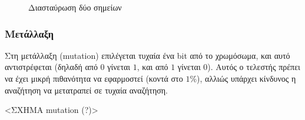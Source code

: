 \begin{figure}[!t]
    \centering
    \def\svgwidth{2.5in}
    
    \caption{Διασταύρωση δύο σημείων \cite{tpc_fig}}
    \label{fig_tpc}
\end{figure}

\subsubsection{Μετάλλαξη}

Στη μετάλλαξη (mutation) επιλέγεται τυχαία ένα bit από το χρωμόσωμα, και αυτό αντιστρέφεται (δηλαδή από $0$ γίνεται $1$, και από $1$ γίνεται $0$). Αυτός ο τελεστής πρέπει να έχει μικρή πιθανότητα να εφαρμοστεί (κοντά στο $1\%$), αλλιώς υπάρχει κίνδυνος η αναζήτηση να μετατραπεί σε τυχαία αναζήτηση. \cite{zotero-PNQJ3TKI}

<ΣΧΗΜΑ mutation (?)>